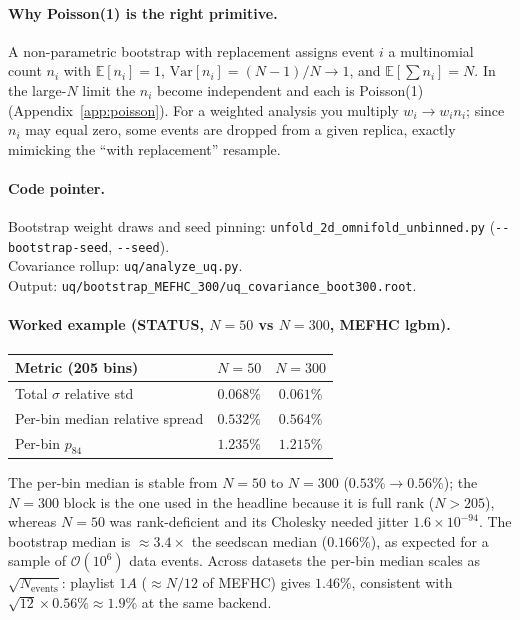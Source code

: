 \paragraph{Why Poisson(1) is the right primitive.}
A non-parametric bootstrap with replacement assigns event $i$ a
multinomial count $n_{i}$ with $\mathbb{E}[n_{i}]=1$,
$\mathrm{Var}[n_{i}] = (N-1)/N \to 1$, and $\mathbb{E}[\sum n_{i}] =
N$. In the large-$N$ limit the $n_{i}$ become independent and each is
Poisson(1) (Appendix~\ref{app:poisson}). For a weighted analysis you
multiply $w_{i}\to w_{i}n_{i}$; since $n_{i}$ may equal zero,
some events are dropped from a given replica, exactly mimicking the
``with replacement'' resample.

\paragraph{Code pointer.}
Bootstrap weight draws and seed pinning:
\texttt{unfold\_2d\_omnifold\_unbinned.py} (\texttt{-{}-bootstrap-seed},
\texttt{-{}-seed}).\\
Covariance rollup: \texttt{uq/analyze\_uq.py}.\\
Output: \texttt{uq/bootstrap\_MEFHC\_300/uq\_covariance\_boot300.root}.

\paragraph{Worked example (STATUS, $N=50$ vs $N=300$, MEFHC lgbm).}
\begin{center}
\begin{tabular}{@{}lcc@{}}
\toprule
Metric (205 bins) & $N=50$ & $N=300$ \\
\midrule
Total $\sigma$ relative std & $0.068\%$ & $\boxed{0.061\%}$ \\
Per-bin median relative spread & $0.532\%$ & $\boxed{0.564\%}$ \\
Per-bin $p_{84}$ & $1.235\%$ & $1.215\%$ \\
\bottomrule
\end{tabular}
\end{center}
The per-bin median is stable from $N=50$ to $N=300$ ($0.53\%\to
0.56\%$); the $N=300$ block is the one used in the headline because it
is full rank ($N>205$), whereas $N=50$ was rank-deficient and its
Cholesky needed jitter $1.6\times 10^{-94}$. The bootstrap median is
$\approx 3.4\times$ the seedscan median ($0.166\%$), as expected for a
sample of $\mathcal{O}(10^{6})$ data events. Across datasets the
per-bin median scales as $\sqrt{N_{\text{events}}}$: playlist $1A$
($\approx N/12$ of MEFHC) gives $1.46\%$, consistent with
$\sqrt{12}\times 0.56\% \approx 1.9\%$ at the same backend.

